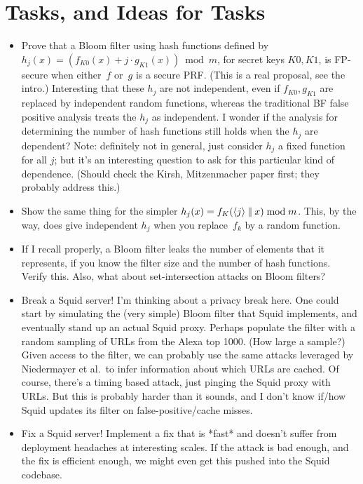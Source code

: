 \section{Tasks, and Ideas for Tasks}

\begin{itemize}
\item Prove that a Bloom filter using hash functions defined by $h_j(x) = \left( f_{K0}(x) + j\cdot g_{K1}(x)\right) \bmod m$, for secret keys $K0,K1$, is FP-secure when either~$f$ or~$g$ is a secure PRF.  (This is a real proposal, see the intro.)  Interesting that these $h_j$ are not independent, even if $f_{K0},g_{K1}$ are replaced by independent random functions, whereas the traditional BF false positive analysis treats the $h_j$ as independent.  I wonder if the analysis for determining the number of hash functions still holds when the $h_j$ are dependent?  Note: definitely not in general, just consider $h_j$ a fixed function for all $j$; but it's an interesting question to ask for this particular kind of dependence.  (Should check the Kirsh, Mitzenmacher paper first; they probably address this.)

\item Show the same thing for the simpler $h_j(x) = f_{K}(\langle j \rangle \: \| \: x) \bmod m$.  This, by the way, does give independent $h_j$ when you replace~$f_k$ by a random function.

\item  If I recall properly, a Bloom filter leaks the number of elements that it represents, if you know the filter size and the number of hash functions.  Verify this.  Also, what about set-intersection attacks on Bloom filters?

\item Break a Squid server!  I'm thinking about a privacy break here.  One could start by simulating the (very simple) Bloom filter that Squid implements, and eventually stand up an actual Squid proxy.  Perhaps populate the filter with a random sampling of URLs from the Alexa top 1000.  (How large a sample?)  Given access to the filter, we can probably use the same attacks leveraged by Niedermayer et al.\ to infer information about which URLs are cached.  Of course, there's a timing based attack, just pinging the Squid proxy with URLs.   But this is probably harder than it sounds, and I don't know if/how Squid updates its filter on false-positive/cache misses.

\item Fix a Squid server!  Implement a fix that is *fast* and doesn't suffer from deployment headaches at interesting scales.  If the attack is bad enough, and the fix is efficient enough, we might even get this pushed into the Squid codebase.


\end{itemize}
